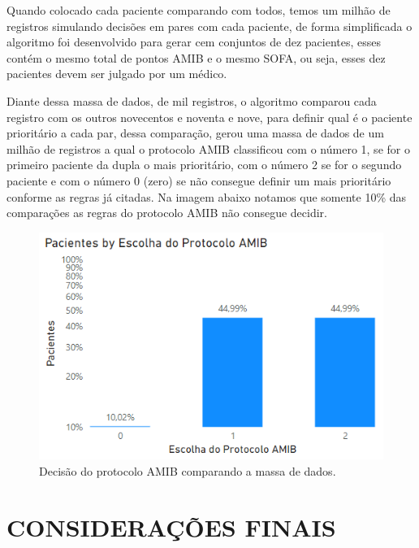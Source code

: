 \documentclass[12pt]{article}
\begin{document}
Quando colocado cada paciente comparando com todos, temos um milhão de registros simulando decisões em pares com cada paciente, de forma simplificada o algoritmo foi desenvolvido para gerar cem conjuntos de dez pacientes, esses contém o mesmo total de pontos AMIB e o mesmo SOFA, ou seja, esses dez pacientes devem ser julgado por um médico. 

Diante dessa massa de dados, de mil registros, o algoritmo comparou cada registro com os outros novecentos e noventa e nove, para definir qual é o paciente prioritário a cada par, dessa comparação, gerou uma massa de dados de um milhão de registros a qual o protocolo AMIB classificou com o número 1, se for o primeiro paciente da dupla o mais prioritário, com o número 2 se for o segundo paciente e com o número 0 (zero) se não consegue definir um mais prioritário conforme as regras já citadas.
Na imagem abaixo notamos que somente 10\% das comparações as regras do protocolo AMIB não consegue decidir.

\begin{figure}[!htb]
    \centering
    \includegraphics[scale=0.9]{img/comparação.png}
    \centering
    \caption{Decisão do protocolo AMIB comparando a massa de dados. }
    \label{Decisão-de-pacientes-1-2-0}
\end{figure}



\clearpage

\section{CONSIDERAÇÕES FINAIS}
\end{document}
